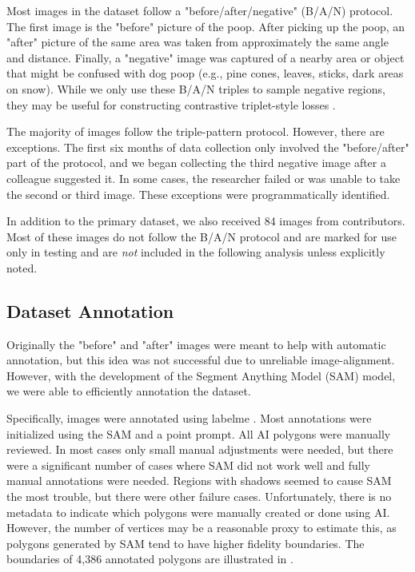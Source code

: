 \documentclass[10pt,twocolumn,letterpaper]{article}
\begin{document}
Most images in the dataset follow a "before/after/negative" (B/A/N) protocol.
The first image is the "before" picture of the poop.
After picking up the poop, an "after" picture of the same area was taken from approximately the same angle
  and distance.
Finally, a "negative" image was captured of a nearby area or object that might be confused with dog poop
  (e.g., pine cones, leaves, sticks, dark areas on snow).
While we only use these B/A/N triples to sample negative regions, they may be useful for constructing
  contrastive triplet-style losses \cite{schroff_facenet_2015}.

The majority of images follow the triple-pattern protocol.
However, there are exceptions.
The first six months of data collection only involved the "before/after" part of the protocol, and we began
  collecting the third negative image after a colleague suggested it.
In some cases, the researcher failed or was unable to take the second or third image.
These exceptions were programmatically identified.
  
In addition to the primary dataset, we also received 84 images from contributors.
Most of these images do not follow the B/A/N protocol and are marked for use only in testing and are
  \emph{not} included in the following analysis unless explicitly noted.


\subsection{Dataset Annotation}

Originally the "before" and "after" images were meant to help with automatic
annotation, but this idea was not successful due to unreliable image-alignment.
However, with the development of the Segment Anything Model (SAM)
\cite{kirillov_segment_2023} model, we were able to efficiently annotation the
dataset. 

Specifically, images were annotated using labelme \cite{wada_labelmeailabelme_nodate}. 
Most annotations were initialized using the SAM and a point prompt. 
All AI polygons were manually reviewed. In most cases only small manual
adjustments were needed, but there were a significant number of cases where SAM
did not work well and fully manual annotations were needed.
Regions with shadows seemed to cause SAM the most trouble, but there were other
failure cases. Unfortunately, there is no metadata to indicate which polygons
were manually created or done using AI.  However, the number of vertices may be
a reasonable proxy to estimate this, as polygons generated by SAM tend to have
higher fidelity boundaries.  The boundaries of 4,386 annotated polygons are
illustrated in .
\end{document}

